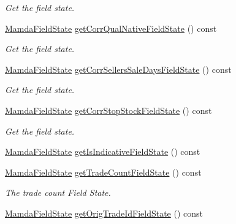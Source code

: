 \begin{CompactItemize}
\begin{CompactList}\small\item\em Get the field state. \item\end{CompactList}\item 
\hyperlink{namespaceWombat_93aac974f2ab713554fd12a1fa3b7d2a}{Mamda\-Field\-State} \hyperlink{classWombat_1_1MamdaTradeListener_4c89a664befaa59336cd1a86204dfc48}{get\-Corr\-Qual\-Native\-Field\-State} () const 
\begin{CompactList}\small\item\em Get the field state. \item\end{CompactList}\item 
\hyperlink{namespaceWombat_93aac974f2ab713554fd12a1fa3b7d2a}{Mamda\-Field\-State} \hyperlink{classWombat_1_1MamdaTradeListener_58d1851bd56ae820eff6f32eefa7509d}{get\-Corr\-Sellers\-Sale\-Days\-Field\-State} () const 
\begin{CompactList}\small\item\em Get the field state. \item\end{CompactList}\item 
\hyperlink{namespaceWombat_93aac974f2ab713554fd12a1fa3b7d2a}{Mamda\-Field\-State} \hyperlink{classWombat_1_1MamdaTradeListener_92765656c70234295c688b60b2e1b50a}{get\-Corr\-Stop\-Stock\-Field\-State} () const 
\begin{CompactList}\small\item\em Get the field state. \item\end{CompactList}\item 
\hyperlink{namespaceWombat_93aac974f2ab713554fd12a1fa3b7d2a}{Mamda\-Field\-State} \hyperlink{classWombat_1_1MamdaTradeListener_2c1db7b289b2f53ff1c2aac5fe55957b}{get\-Is\-Indicative\-Field\-State} () const 
\item 
\hyperlink{namespaceWombat_93aac974f2ab713554fd12a1fa3b7d2a}{Mamda\-Field\-State} \hyperlink{classWombat_1_1MamdaTradeListener_f79d9119125ef4907ba4227d1176bd04}{get\-Trade\-Count\-Field\-State} () const 
\begin{CompactList}\small\item\em The trade count Field State. \item\end{CompactList}\item 
\hyperlink{namespaceWombat_93aac974f2ab713554fd12a1fa3b7d2a}{Mamda\-Field\-State} \hyperlink{classWombat_1_1MamdaTradeListener_0bb23e403d65e8c21a3e9474fba0273a}{get\-Orig\-Trade\-Id\-Field\-State} () const 

\end{CompactItemize}
